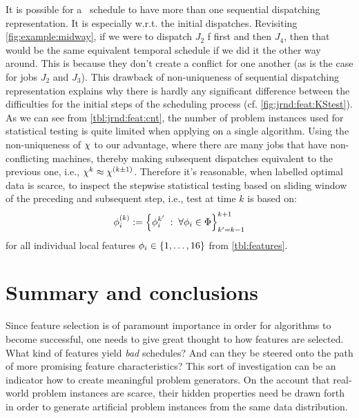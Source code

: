 It is possible for a \JSP\ schedule to have more than one sequential 
dispatching representation. It is especially w.r.t. the initial dispatches. 
Revisiting \cref{fig:example:midway}, if we were to dispatch $J_2$ f
first and then $J_4$, then that would be the same equivalent
temporal schedule if we did it the other way around. 
This is because they don't create a conflict for one another 
(as is the case for jobs $J_2$ and $J_3$). This drawback of non-uniqueness of 
sequential dispatching representation explains why there is hardly any 
significant difference between the difficulties for the initial steps of the 
scheduling process (cf. \cref{fig:jrnd:feat:KStest}).
As we can see from \cref{tbl:jrnd:feat:cnt}, the number of problem instances 
used for statistical testing is quite limited when applying on a single 
algorithm. 
Using the non-uniqueness of ${\mathbf{\chi}}$ to our advantage, where there are many jobs 
that have non-conflicting machines, thereby making subsequent dispatches 
equivalent to the previous one, i.e., ${\mathbf{\chi}}^k \approx  {\mathbf{\chi}}^{(k\pm1)}$. 
Therefore it's reasonable, when labelled optimal data is scarce, to inspect the 
stepwise statistical testing based on sliding window of the preceding and 
subsequent step, i.e., test at time $k$ is based on: 
\begin{equation}
{\mathbf{\phi}}_i^{(k)} := \left\{\phi_i^{k'}\;:\;\forall \phi_i\in\Phi\right\}_{k'=k-1}^{k+1} 
\end{equation}
for all individual local features $\phi_i\in\{1,\ldots,16\}$ from 
\cref{tbl:features}.


\section{Summary and conclusions}


Since feature selection is of paramount importance in order for algorithms to 
become successful, one needs to give great thought to how features are 
selected. What kind of features yield \emph{bad} schedules? And can they be 
steered onto the path of more promising feature characteristics? This sort of 
investigation can be an indicator how to create meaningful problem generators. 
On the account that real-world problem instances are scarce, their hidden 
properties need be drawn forth in order to generate artificial problem 
instances from the same data distribution. 

